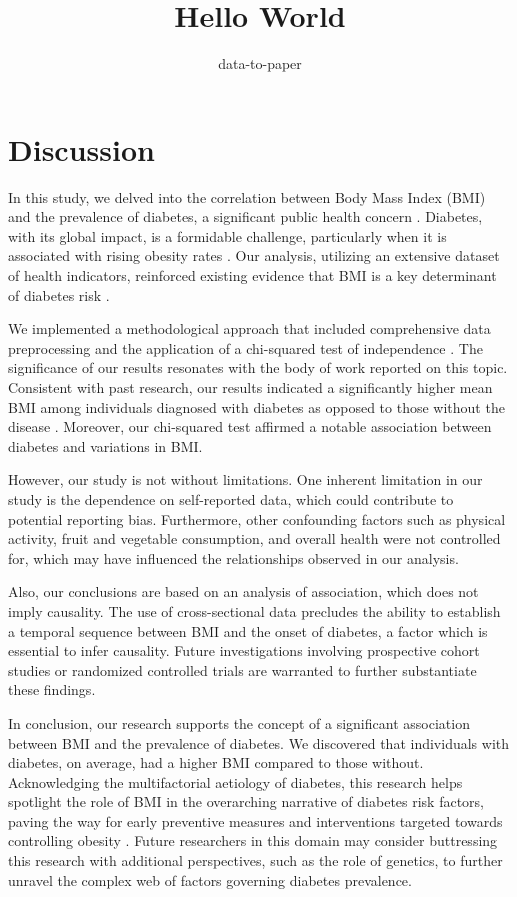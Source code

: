 \documentclass[12pt]{article}
\title{Hello World}
\author{data-to-paper}
\begin{document}
\maketitle

\section{Discussion}

In this study, we delved into the correlation between Body Mass Index (BMI) and the prevalence of diabetes, a significant public health concern \cite{Uloko2018PrevalenceAR}. Diabetes, with its global impact, is a formidable challenge, particularly when it is associated with rising obesity rates \cite{Mokdad2001TheCE}. Our analysis, utilizing an extensive dataset of health indicators, reinforced existing evidence that BMI is a key determinant of diabetes risk \cite{Zhu2019RacialEthnicDI, rnlv2010ImpactOB}.

We implemented a methodological approach that included comprehensive data preprocessing and the application of a chi-squared test of independence \cite{Mongraw-Chaffin2015TheSA}. The significance of our results resonates with the body of work reported on this topic. Consistent with past research, our results indicated a significantly higher mean BMI among individuals diagnosed with diabetes as opposed to those without the disease \cite{rnlv2010ImpactOB, Rho2014IndependentIO, Read2021BMIAR}. Moreover, our chi-squared test affirmed a notable association between diabetes and variations in BMI.

However, our study is not without limitations. One inherent limitation in our study is the dependence on self-reported data, which could contribute to potential reporting bias. Furthermore, other confounding factors such as physical activity, fruit and vegetable consumption, and overall health were not controlled for, which may have influenced the relationships observed in our analysis. 

Also, our conclusions are based on an analysis of association, which does not imply causality. The use of cross-sectional data precludes the ability to establish a temporal sequence between BMI and the onset of diabetes, a factor which is essential to infer causality. Future investigations involving prospective cohort studies or randomized controlled trials are warranted to further substantiate these findings.

In conclusion, our research supports the concept of a significant association between BMI and the prevalence of diabetes. We discovered that individuals with diabetes, on average, had a higher BMI compared to those without. Acknowledging the multifactorial aetiology of diabetes, this research helps spotlight the role of BMI in the overarching narrative of diabetes risk factors, paving the way for early preventive measures and interventions targeted towards controlling obesity \cite{Zhu2019RacialEthnicDI}. Future researchers in this domain may consider buttressing this research with additional perspectives, such as the role of genetics, to further unravel the complex web of factors governing diabetes prevalence.
\end{document}
